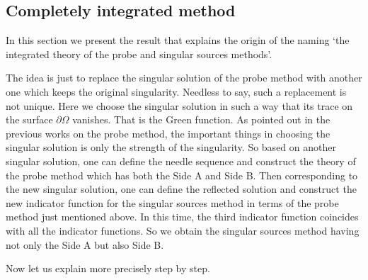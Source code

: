  
 
 
 
  
  
  
  
  
  
  
  
  
  
  
  
  
  
  
  
  
  
  
  
  
  
  
  
  
\subsection{Completely integrated method}
  
  
In this section we present the result  that explains the origin of  the naming 
`the integrated theory of  the probe and singular sources methods'.

The idea is just to replace the singular solution of the probe method with another one which keeps the original singularity.
Needless to say, such a replacement is not unique.  Here we choose the singular solution in such a way that
its trace on the surface $\partial\Omega$ vanishes.  That is the Green function.
As pointed out in the previous works on the probe method, the important things in choosing the singular solution
is only the strength of the singularity.  So based on another singular solution, one can define the needle sequence and construct the theory of the probe method which has both the Side A and Side B.  Then corresponding to the new singular solution, one can define
the reflected solution and construct the new indicator function for the singular sources method in terms of the probe method just mentioned above.  In this time, the third indicator function coincides with all the indicator functions.
So we obtain the singular sources method having not only the Side A but also Side B.


Now let us explain more precisely step by step.



















